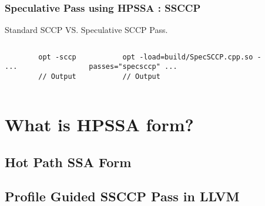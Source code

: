 \documentclass[aspectratio=169]{beamer}
\begin{document}
\begin{frame}[fragile]
	\frametitle{Speculative Pass using HPSSA : SSCCP}
	Standard SCCP VS. Speculative SCCP Pass.
\begin{columns}
	\begin{column}{0.2\textwidth}
		\begin{verbatim}
		opt -sccp ...
		// Output
		\end{verbatim}
	\end{column}
	\begin{column}{0.5\textwidth}  
		\begin{verbatim}
		opt -load=build/SpecSCCP.cpp.so -passes="specsccp" ...
		// Output 
		\end{verbatim}
	\end{column}
\end{columns}
\end{frame}

\section{What is HPSSA form?}
\subsection{Hot Path SSA Form}
{
	
}
\subsection{Profile Guided SSCCP Pass in LLVM}
{
	
}
\end{document}
